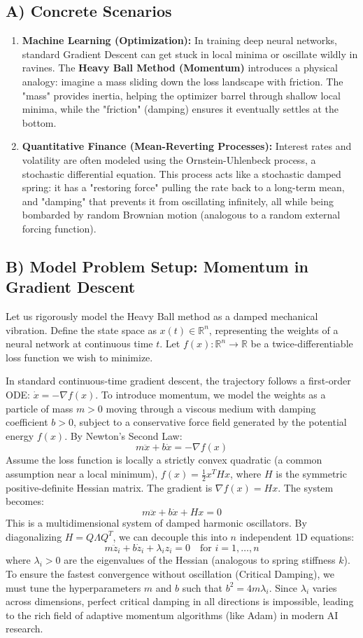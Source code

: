 \documentclass[11pt]{article}
\begin{document}
\subsection{A) Concrete Scenarios}
\begin{enumerate}
    \item \textbf{Machine Learning (Optimization):} In training deep neural networks, standard Gradient Descent can get stuck in local minima or oscillate wildly in ravines. The \textbf{Heavy Ball Method (Momentum)} introduces a physical analogy: imagine a mass sliding down the loss landscape with friction. The "mass" provides inertia, helping the optimizer barrel through shallow local minima, while the "friction" (damping) ensures it eventually settles at the bottom.
    \item \textbf{Quantitative Finance (Mean-Reverting Processes):} Interest rates and volatility are often modeled using the Ornstein-Uhlenbeck process, a stochastic differential equation. This process acts like a stochastic damped spring: it has a "restoring force" pulling the rate back to a long-term mean, and "damping" that prevents it from oscillating infinitely, all while being bombarded by random Brownian motion (analogous to a random external forcing function).
\end{enumerate}

\subsection{B) Model Problem Setup: Momentum in Gradient Descent}
Let us rigorously model the Heavy Ball method as a damped mechanical vibration.
Define the state space as $x(t) \in \mathbb{R}^n$, representing the weights of a neural network at continuous time $t$. Let $f(x): \mathbb{R}^n \to \mathbb{R}$ be a twice-differentiable loss function we wish to minimize.

In standard continuous-time gradient descent, the trajectory follows a first-order ODE: $\dot{x} = -\nabla f(x)$.
To introduce momentum, we model the weights as a particle of mass $m > 0$ moving through a viscous medium with damping coefficient $b > 0$, subject to a conservative force field generated by the potential energy $f(x)$. By Newton's Second Law:
\[ m \ddot{x} + b \dot{x} = -\nabla f(x) \]
Assume the loss function is locally a strictly convex quadratic (a common assumption near a local minimum), $f(x) = \frac{1}{2} x^T H x$, where $H$ is the symmetric positive-definite Hessian matrix. The gradient is $\nabla f(x) = Hx$. The system becomes:
\[ m \ddot{x} + b \dot{x} + Hx = 0 \]
This is a multidimensional system of damped harmonic oscillators. By diagonalizing $H = Q \Lambda Q^T$, we can decouple this into $n$ independent 1D equations:
\[ m \ddot{z}_i + b \dot{z}_i + \lambda_i z_i = 0 \quad \text{for } i = 1, \dots, n \]
where $\lambda_i > 0$ are the eigenvalues of the Hessian (analogous to spring stiffness $k$). 
To ensure the fastest convergence without oscillation (Critical Damping), we must tune the hyperparameters $m$ and $b$ such that $b^2 = 4m\lambda_i$. Since $\lambda_i$ varies across dimensions, perfect critical damping in all directions is impossible, leading to the rich field of adaptive momentum algorithms (like Adam) in modern AI research.
\end{document}
